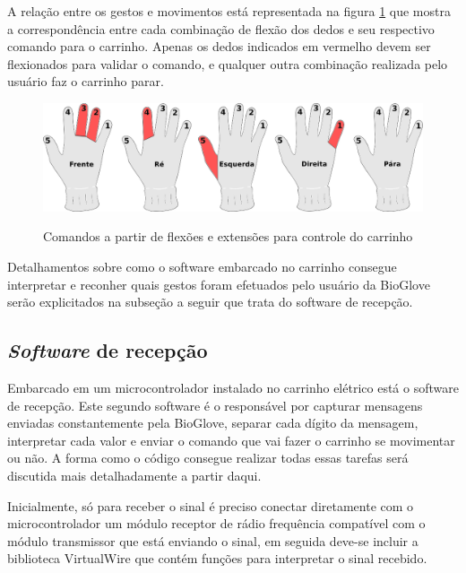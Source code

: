 \documentclass[
	12pt,				%
	openright,			%
	oneside,			%
	a4paper,			%
	english,			%
	brazil				%
	]{abntex2}
\begin{document}
		A relação entre os gestos e movimentos está representada na figura \ref{Fig:glove-control-positions1} que mostra a correspondência entre cada combinação de flexão dos dedos e seu respectivo comando para o carrinho. Apenas os dedos indicados em vermelho devem ser flexionados para validar o comando, e qualquer outra combinação realizada pelo usuário faz o carrinho parar.


		\begin{figure}[h!]
			\centering
			\caption{Comandos a partir de flexões e extensões para controle do carrinho}
  		\includegraphics[width=14cm]{./figures/glove-control-positions1.png}
  		\label{Fig:glove-control-positions1}
		\end{figure}

		Detalhamentos sobre como o software embarcado no carrinho consegue interpretar e reconher quais gestos foram efetuados pelo usuário da BioGlove serão explicitados na subseção a seguir que trata do software de recepção.



	

		
		\subsection{\textit{Software} de recepção}


		Embarcado em um microcontrolador instalado no carrinho elétrico está o software de recepção. Este segundo software é o responsável por capturar mensagens enviadas constantemente pela BioGlove, separar cada dígito da mensagem, interpretar cada valor e enviar o comando que vai fazer o carrinho se movimentar ou não. A forma como o código consegue realizar todas essas tarefas será discutida mais detalhadamente a partir daqui.
		
		Inicialmente, só para receber o sinal é preciso conectar diretamente com o microcontrolador um módulo receptor de rádio frequência compatível com o módulo transmissor que está enviando o sinal, em seguida deve-se incluir a biblioteca VirtualWire que contém funções para interpretar o sinal recebido. 
\end{document}
